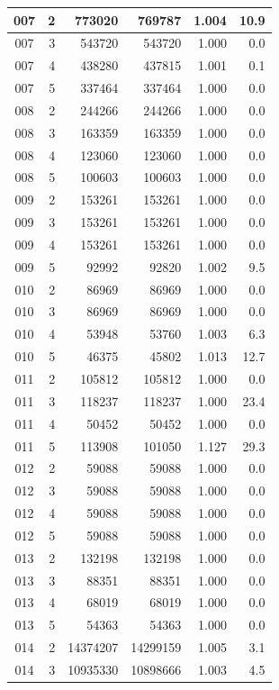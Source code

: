 \begin{longtable}{|c|r|r|r|r|r|}
\hline
007 & 2 & 773020 & 769787 & 1.004 & 10.9 \\
\hline
007 & 3 & 543720 & 543720 & 1.000 & 0.0 \\
\hline
007 & 4 & 438280 & 437815 & 1.001 & 0.1 \\
\hline
007 & 5 & 337464 & 337464 & 1.000 & 0.0 \\
\hline
008 & 2 & 244266 & 244266 & 1.000 & 0.0 \\
\hline
008 & 3 & 163359 & 163359 & 1.000 & 0.0 \\
\hline
008 & 4 & 123060 & 123060 & 1.000 & 0.0 \\
\hline
008 & 5 & 100603 & 100603 & 1.000 & 0.0 \\
\hline
009 & 2 & 153261 & 153261 & 1.000 & 0.0 \\
\hline
009 & 3 & 153261 & 153261 & 1.000 & 0.0 \\
\hline
009 & 4 & 153261 & 153261 & 1.000 & 0.0 \\
\hline
009 & 5 & 92992 & 92820 & 1.002 & 9.5 \\
\hline
010 & 2 & 86969 & 86969 & 1.000 & 0.0 \\
\hline
010 & 3 & 86969 & 86969 & 1.000 & 0.0 \\
\hline
010 & 4 & 53948 & 53760 & 1.003 & 6.3 \\
\hline
010 & 5 & 46375 & 45802 & 1.013 & 12.7 \\
\hline
011 & 2 & 105812 & 105812 & 1.000 & 0.0 \\
\hline
011 & 3 & 118237 & 118237 & 1.000 & 23.4 \\
\hline
011 & 4 & 50452 & 50452 & 1.000 & 0.0 \\
\hline
011 & 5 & 113908 & 101050 & 1.127 & 29.3 \\
\hline
012 & 2 & 59088 & 59088 & 1.000 & 0.0 \\
\hline
012 & 3 & 59088 & 59088 & 1.000 & 0.0 \\
\hline
012 & 4 & 59088 & 59088 & 1.000 & 0.0 \\
\hline
012 & 5 & 59088 & 59088 & 1.000 & 0.0 \\
\hline
013 & 2 & 132198 & 132198 & 1.000 & 0.0 \\
\hline
013 & 3 & 88351 & 88351 & 1.000 & 0.0 \\
\hline
013 & 4 & 68019 & 68019 & 1.000 & 0.0 \\
\hline
013 & 5 & 54363 & 54363 & 1.000 & 0.0 \\
\hline
014 & 2 & 14374207 & 14299159 & 1.005 & 3.1 \\
\hline
014 & 3 & 10935330 & 10898666 & 1.003 & 4.5 \\

\end{longtable}
